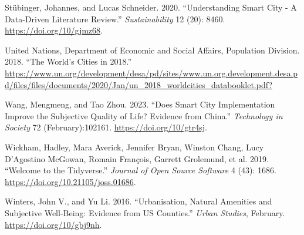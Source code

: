 \documentclass[
  english,
  12pt,
  a4paper,
]{scrartcl}
\newlength{\cslhangindent}
\newenvironment{CSLReferences}[2] %
 {\begin{list}{}{%
  \setlength{\itemindent}{0pt}
  \setlength{\leftmargin}{0pt}
  \setlength{\parsep}{0pt}
  \ifodd #1
   \setlength{\leftmargin}{\cslhangindent}
   \setlength{\itemindent}{-1\cslhangindent}
  \fi
  \setlength{\itemsep}{#2\baselineskip}}}
 {\end{list}}
\begin{document}
\begin{CSLReferences}{1}{0}
Stübinger, Johannes, and Lucas Schneider. 2020. {``Understanding {Smart
City} - {A} Data-Driven Literature Review.''} \emph{Sustainability} 12
(20): 8460. \url{https://doi.org/10/gjmz68}.

United Nations, Department of Economic and Social Affairs, Population
Division. 2018. {``The {World}'s Cities in 2018.''}
\url{https://www.un.org/development/desa/pd/sites/www.un.org.development.desa.pd/files/files/documents/2020/Jan/un_2018_worldcities_databooklet.pdf?}

Wang, Mengmeng, and Tao Zhou. 2023. {``Does Smart City Implementation
Improve the Subjective Quality of Life? {Evidence} from {China}.''}
\emph{Technology in Society} 72 (February):102161.
\url{https://doi.org/10/gtr4sj}.

Wickham, Hadley, Mara Averick, Jennifer Bryan, Winston Chang, Lucy
D'Agostino McGowan, Romain François, Garrett Grolemund, et al. 2019.
{``Welcome to the Tidyverse.''} \emph{Journal of Open Source Software} 4
(43): 1686. \url{https://doi.org/10.21105/joss.01686}.

Winters, John V., and Yu Li. 2016. {``Urbanisation, Natural Amenities
and Subjective Well-Being: {Evidence} from {US} Counties.''} \emph{Urban
Studies}, February. \url{https://doi.org/10/gbj9nh}.

\end{CSLReferences}
\end{document}
